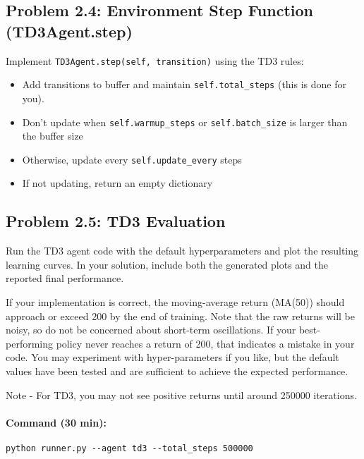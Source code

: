 \documentclass[12pt]{article}
\begin{document}


\subsection*{Problem 2.4: Environment Step Function (TD3Agent.step)}
Implement \texttt{TD3Agent.step(self, transition)} using the TD3 rules:
\begin{itemize}
  \item Add transitions to buffer and maintain \texttt{self.total\_steps} (this is done for you).
  \item Don't update when \texttt{self.warmup\_steps} or \texttt{self.batch_size} is larger than the buffer size
  \item Otherwise, update every \texttt{self.update\_every} steps
  \item If not updating, return an empty dictionary
\end{itemize}

\subsection*{Problem 2.5: TD3 Evaluation}

Run the TD3 agent code with the default hyperparameters and plot the resulting learning curves.  In your solution, include both the generated plots and the reported final performance.

If your implementation is correct, the moving-average return (MA(50)) should approach
or exceed 200 by the end of training. Note that the raw returns will be noisy, so do not
be concerned about short-term oscillations. If your best-performing policy never reaches a
return of 200, that indicates a mistake in your code.
You may experiment with hyper-parameters if you like, but the default values have been tested and are sufficient to achieve the expected performance.  

Note - For TD3, you may not see positive returns until around 250000 iterations.

\paragraph{Command (30 min):}
\begin{verbatim}
python runner.py --agent td3 --total_steps 500000
\end{verbatim}
\end{document}
